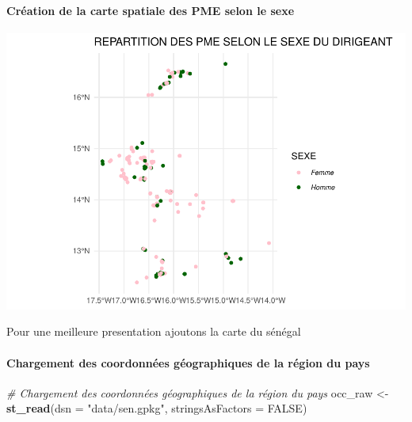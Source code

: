 \documentclass[
]{article}
\newenvironment{Shaded}{\begin{snugshade}}{\end{snugshade}}
\newcommand{\AttributeTok}[1]{\textcolor[rgb]{0.13,0.29,0.53}{#1}}
\newcommand{\CommentTok}[1]{\textcolor[rgb]{0.56,0.35,0.01}{\textit{#1}}}
\newcommand{\ConstantTok}[1]{\textcolor[rgb]{0.56,0.35,0.01}{#1}}
\newcommand{\FunctionTok}[1]{\textcolor[rgb]{0.13,0.29,0.53}{\textbf{#1}}}
\newcommand{\NormalTok}[1]{#1}
\newcommand{\OtherTok}[1]{\textcolor[rgb]{0.56,0.35,0.01}{#1}}
\newcommand{\StringTok}[1]{\textcolor[rgb]{0.31,0.60,0.02}{#1}}
\begin{document}
\hfill\break

\hypertarget{cruxe9ation-de-la-carte-spatiale-des-pme-selon-le-sexe}{%
\paragraph{Création de la carte spatiale des PME selon le
sexe}\label{cruxe9ation-de-la-carte-spatiale-des-pme-selon-le-sexe}}

\hfill\break

\begin{center}\includegraphics{Projet_R_ISE_1_files/figure-latex/unnamed-chunk-33-1} \end{center}

\hfill\break
Pour une meilleure presentation ajoutons la carte du sénégal\\

\hypertarget{chargement-des-coordonnuxe9es-guxe9ographiques-de-la-ruxe9gion-du-pays}{%
\paragraph{Chargement des coordonnées géographiques de la région du
pays}\label{chargement-des-coordonnuxe9es-guxe9ographiques-de-la-ruxe9gion-du-pays}}

\hfill\break

\begin{Shaded}
\begin{Highlighting}[]
\CommentTok{\# Chargement des coordonnées géographiques de la région du pays}
\NormalTok{occ\_raw }\OtherTok{\textless{}{-}} \FunctionTok{st\_read}\NormalTok{(}\AttributeTok{dsn =} \StringTok{"data/sen.gpkg"}\NormalTok{, }\AttributeTok{stringsAsFactors =} \ConstantTok{FALSE}\NormalTok{)}
\end{Highlighting}
\end{Shaded}
\end{document}
